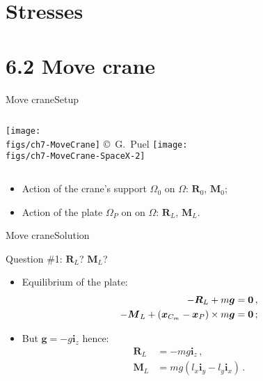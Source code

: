 \documentclass{beamer}
\newcommand{\xj}{x}
\newcommand{\yj}{y}
\newcommand{\zj}{z}
\newcommand{\xv}{{\boldsymbol\xj}}
\renewcommand{\ij}{i}
\newcommand{\iv}{{\boldsymbol\ij}}
\newcommand{\medium}{\Omega}
\newcommand{\gj}{g}
\newcommand{\gv}{{\boldsymbol\gj}}
\newcommand{\Fresj}{R}
\newcommand{\Mresj}{M}
\newcommand{\Fres}{{\boldsymbol\Fresj}}
\newcommand{\Mres}{{\boldsymbol\Mresj}}
\newcommand{\bzero}{{\bf 0}}
\begin{document}
\section{Stresses}


\section{6.2 Move crane}

\begin{frame}{Move crane}{Setup}

\begin{columns}[t]
\centering\texttt{[image: \\figs/ch7-MoveCrane]}
\vskip-10pt{\hspace{2.5truecm}\mbox{\tiny{\copyright\ G. Puel}}}
\vskip-110pt
\centering\texttt{[image: \\figs/ch7-MoveCrane-SpaceX-2]}
\end{columns}
\vskip20pt
\begin{itemize}
\item Action of the crane's support $\medium_0$ on $\medium$: $\Fres_0$, $\Mres_0$; 
\item Action of the plate $\medium_P$ on on $\medium$: $\Fres_L$, $\Mres_L$. 
\end{itemize}
\end{frame}

\begin{frame}{Move crane}{Solution}

\begin{exampleblock}{Question \#1: $\Fres_L$? $\Mres_L$?}
\begin{itemize}
\item Equilibrium of the plate:
\begin{displaymath}
\begin{split}
-\Fres_L+m\gv &=\bzero \,,\\
-\Mres_L+(\xv_{C_m}-\xv_P)\times m\gv &=\bzero\,;
\end{split}
\end{displaymath}
\item But $\gv=-g\iv_\zj$ hence:
\begin{displaymath}
\begin{split}
\Fres_L &=-mg\iv_\zj\,, \\
\Mres_L &=mg(l_\xj\iv_\yj-l_\yj\iv_\xj)\,.
\end{split}
\end{displaymath}
\end{itemize}
\end{exampleblock}

\end{frame}
\end{document}
